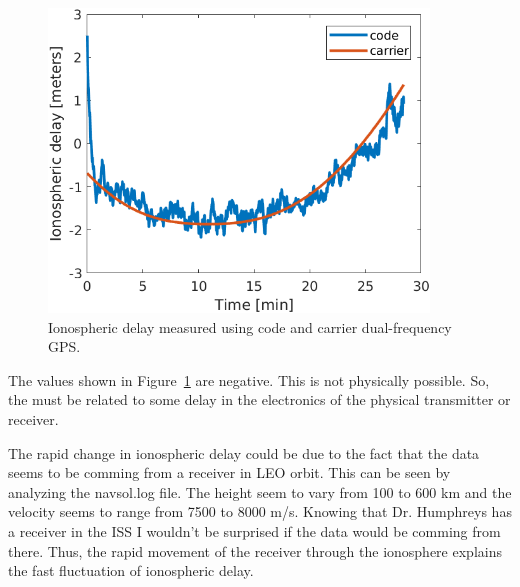 \begin{figure}[H]
	\centering
	\includegraphics[width=0.9\textwidth]{figs/ex4_iono_delay.png}
	\caption{Ionospheric delay measured using code and carrier dual-frequency GPS.}
	\label{fig:ex4_iono_delay}
\end{figure}

The values shown in Figure~\ref{fig:ex4_iono_delay} are negative. This is not
physically possible. So, the must be related to some delay in the electronics
of the physical transmitter or receiver.

The rapid change in ionospheric delay could be due to the fact that the data
seems to be comming from a receiver in LEO orbit. This can be seen by analyzing
the navsol.log file. The height seem to vary from 100 to 600 km and the
velocity seems to range from 7500 to 8000 m/s. Knowing that Dr. Humphreys has a
receiver in the ISS I wouldn't be surprised if the data would be comming from
there. Thus, the rapid movement of the receiver through the ionosphere explains
the fast fluctuation of ionospheric delay.
